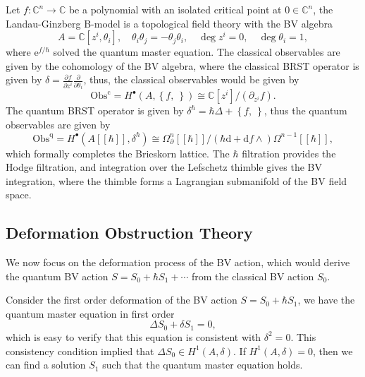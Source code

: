\documentclass[10pt]{article}
\begin{document}
\begin{example}
  Let $ f: \mathbb{C}^{n} \rightarrow \mathbb{C}$ be a polynomial with an isolated critical point at $ 0 \in \mathbb{C}^{n}$, the Landau-Ginzberg B-model is a topological field theory with the BV algebra
  \begin{equation*}
    A = \mathbb{C}[z^{i}, \theta_{i}], \quad \theta_{i} \theta_{j} = - \theta_{j} \theta_{i}, \quad \deg z^{i} = 0, \quad \deg \theta_{i} = 1,
  \end{equation*}
  where $ \mathrm{e}^{f / \hbar}$ solved the quantum master equation. The classical observables are given by the cohomology of the BV algebra, where the classical BRST operator is given by $\delta = \frac{\partial f}{\partial z^{i}} \frac{\partial }{\partial \theta_{i}}$,
  thus, the classical observables would be given by
  \begin{equation*}
    \mathrm{Obs}^{\mathrm{c}} = H^{\bullet}(A, \left\{ f, ~ \right\}) \cong \mathbb{C}[z^{i}] / \left( \partial_{z^{i}} f \right).
  \end{equation*}
  The quantum BRST operator is given by $ \delta^{\hbar} = \hbar \Delta + \left\{ f, ~ \right\}$, thus the quantum observables are given by
  \begin{equation*}
    \mathrm{Obs}^{\mathrm{q}} = H^{\bullet}(A[[\hbar]], \delta^{\hbar}) \cong \Omega^{n}_{\partial}[[\hbar]] / (\hbar\mathrm{d} + \mathrm{d} f \wedge) \Omega^{n-1}[[\hbar]],
  \end{equation*}
  which formally completes the Brieskorn lattice.
  The $ \hbar$ filtration provides the Hodge filtration, and integration over the Lefschetz thimble gives the BV integration, where the thimble forms a Lagrangian submanifold of the BV field space.

\end{example}

\subsection{Deformation Obstruction Theory}

We now focus on the deformation process of the BV action, which would derive the quantum BV action $ S = S_0 + \hbar S_1 + \cdots $ from the classical BV action $ S_0$.

Consider the first order deformation of the BV action $ S = S_0 + \hbar S_1$, we have the quantum master equation in first order
\begin{equation*}
  \Delta S_0 + \delta S_1 = 0,
\end{equation*}
which is easy to verify that this equation is consistent with $ \delta^{2} = 0$. This consistency condition implied that $ \Delta S_0 \in H^{1}(A, \delta)$. If $ H^{1}(A, \delta) = 0$, then we can find a solution $ S_1$ such that the quantum master equation holds.
\end{document}
